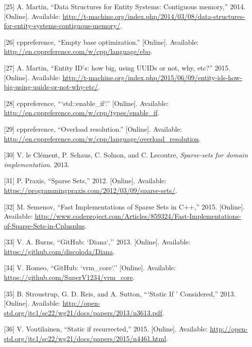 \documentclass[oneside, 12pt, a4paper, openany]{book}
\begin{document}
\hypertarget{ref-tmachine_compstorage}{}
{[}25{]} A. Martin, ``Data Structures for Entity Systems: Contiguous
memory,'' 2014. {[}Online{]}. Available:
\url{http://t-machine.org/index.php/2014/03/08/data-structures-for-entity-systems-contiguous-memory/}.

\hypertarget{ref-cppreference_ebo}{}
{[}26{]} cppreference, ``Empty base optimization.'' {[}Online{]}.
Available: \url{http://en.cppreference.com/w/cpp/language/ebo}.

\hypertarget{ref-tmachine_eids}{}
{[}27{]} A. Martin, ``Entity ID's: how big, using UUIDs or not, why,
etc?'' 2015. {[}Online{]}. Available:
\url{http://t-machine.org/index.php/2015/06/09/entity-ids-how-big-using-uuids-or-not-why-etc/}.

\hypertarget{ref-cppreference_enable_if}{}
{[}28{]} cppreference, ```std::enable\_if`.'' {[}Online{]}. Available:
\url{http://en.cppreference.com/w/cpp/types/enable_if}.

\hypertarget{ref-cppreference_overload_resolution}{}
{[}29{]} cppreference, ``Overload resolution.'' {[}Online{]}. Available:
\url{http://en.cppreference.com/w/cpp/language/overload_resolution}.

\hypertarget{ref-sparsesets132}{}
{[}30{]} V. le Clément, P. Schaus, C. Solnon, and C. Lecoutre,
\emph{Sparse-sets for domain implementation}. 2013.

\hypertarget{ref-sparsesets_praxis}{}
{[}31{]} P. Praxis, ``Sparse Sets,'' 2012. {[}Online{]}. Available:
\url{https://programmingpraxis.com/2012/03/09/sparse-sets/}.

\hypertarget{ref-sparsesets_cpp}{}
{[}32{]} M. Semenov, ``Fast Implementations of Sparse Sets in C++,''
2015. {[}Online{]}. Available:
\url{http://www.codeproject.com/Articles/859324/Fast-Implementations-of-Sparse-Sets-in-Cplusplus}.

\hypertarget{ref-github_diana}{}
{[}33{]} V. A. Burns, ``GitHub: `Diana`,'' 2013. {[}Online{]}.
Available: \url{https://github.com/discoloda/Diana}.

\hypertarget{ref-github_vrmcore}{}
{[}34{]} V. Romeo, ``GitHub: `vrm\_core`.'' {[}Online{]}. Available:
\url{https://github.com/SuperV1234/vrm_core}.

\hypertarget{ref-isocpp_sif0}{}
{[}35{]} B. Stroustrup, G. D. Reis, and A. Sutton, ```Static If '
Considered,'' 2013. {[}Online{]}. Available:
\url{http://open-std.org/jtc1/sc22/wg21/docs/papers/2013/n3613.pdf}.

\hypertarget{ref-isocpp_sif1}{}
{[}36{]} V. Voutilainen, ``Static if resurrected,'' 2015. {[}Online{]}.
Available:
\url{http://open-std.org/jtc1/sc22/wg21/docs/papers/2015/n4461.html}.
\end{document}

